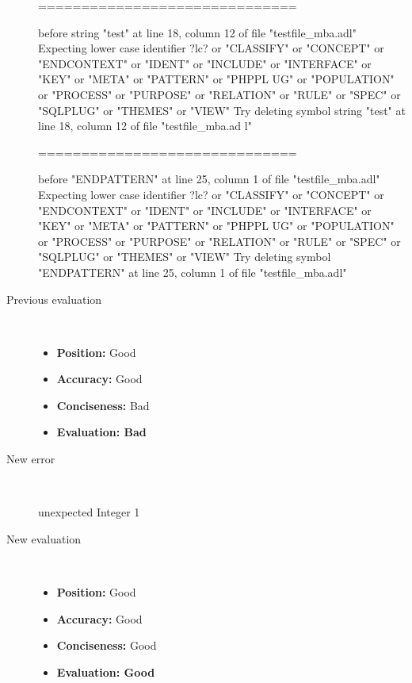 \begin{description}
\begin{haskell}
==============================

before string "test" at line 18, column 12 of file "testfile_mba.adl"
Expecting lower case identifier ?lc? or "CLASSIFY" or "CONCEPT" or "ENDCONTEXT"
or "IDENT" or "INCLUDE" or "INTERFACE" or "KEY" or "META" or "PATTERN" or "PHPPL
UG" or "POPULATION" or "PROCESS" or "PURPOSE" or "RELATION" or "RULE" or "SPEC"
or "SQLPLUG" or "THEMES" or "VIEW"
Try deleting symbol string "test" at line 18, column 12 of file "testfile_mba.ad
l"

==============================

before "ENDPATTERN" at line 25, column 1 of file "testfile_mba.adl"
Expecting lower case identifier ?lc? or "CLASSIFY" or "CONCEPT" or "ENDCONTEXT"
or "IDENT" or "INCLUDE" or "INTERFACE" or "KEY" or "META" or "PATTERN" or "PHPPL
UG" or "POPULATION" or "PROCESS" or "PURPOSE" or "RELATION" or "RULE" or "SPEC"
or "SQLPLUG" or "THEMES" or "VIEW"
Try deleting symbol "ENDPATTERN" at line 25, column 1 of file "testfile_mba.adl"
\end{haskell}
  \item[Previous evaluation]~\\
    \begin{itemize}
    \item \textbf{Position:} Good
    \item \textbf{Accuracy:} Good
    \item \textbf{Conciseness:} Bad
    \item \textbf{Evaluation: Bad}
    \end{itemize}
  \item[New error]~\\
\begin{haskell}
unexpected Integer 1\end{haskell}
  \item[New evaluation]~\\
    \begin{itemize}
    \item \textbf{Position:} Good
    \item \textbf{Accuracy:} Good
    \item \textbf{Conciseness:} Good
    \item \textbf{Evaluation: Good}
    \end{itemize}
  \end{description}

\hrulefill

